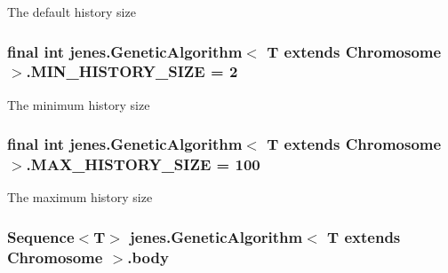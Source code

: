 The default history size \hypertarget{classjenes_1_1_genetic_algorithm_3_01_t_01extends_01_chromosome_01_4_a64b297086826bfbda1fbaccebe4cb24}{
\subsubsection[MIN\_\-HISTORY\_\-SIZE]{\setlength{\rightskip}{0pt plus 5cm}final int jenes.GeneticAlgorithm$<$ T extends Chromosome $>$.{\bf MIN\_\-HISTORY\_\-SIZE} = 2}}
\label{classjenes_1_1_genetic_algorithm_3_01_t_01extends_01_chromosome_01_4_a64b297086826bfbda1fbaccebe4cb24}


The minimum history size \hypertarget{classjenes_1_1_genetic_algorithm_3_01_t_01extends_01_chromosome_01_4_cd26085cf69c68d607ef08d0bf829224}{
\subsubsection[MAX\_\-HISTORY\_\-SIZE]{\setlength{\rightskip}{0pt plus 5cm}final int jenes.GeneticAlgorithm$<$ T extends Chromosome $>$.{\bf MAX\_\-HISTORY\_\-SIZE} = 100}}
\label{classjenes_1_1_genetic_algorithm_3_01_t_01extends_01_chromosome_01_4_cd26085cf69c68d607ef08d0bf829224}


The maximum history size \hypertarget{classjenes_1_1_genetic_algorithm_3_01_t_01extends_01_chromosome_01_4_0040f9dbb0018e8bb28dde97dacac7d8}{
\subsubsection[body]{\setlength{\rightskip}{0pt plus 5cm}Sequence$<$T$>$ jenes.GeneticAlgorithm$<$ T extends Chromosome $>$.{\bf body}}}
\label{classjenes_1_1_genetic_algorithm_3_01_t_01extends_01_chromosome_01_4_0040f9dbb0018e8bb28dde97dacac7d8}


